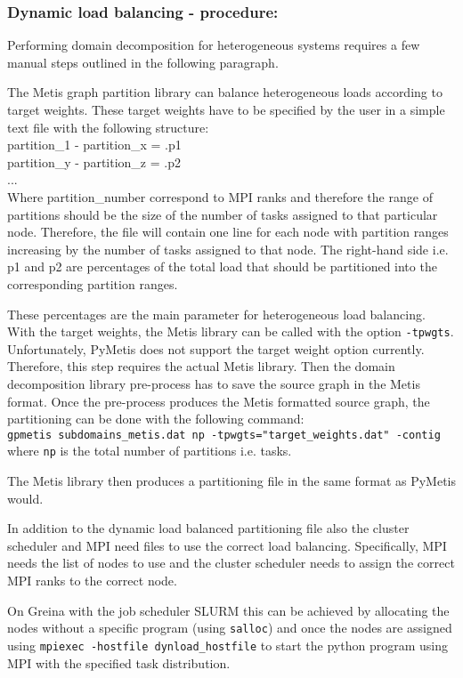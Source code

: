 \subsubsection{Dynamic load balancing - procedure:}
Performing domain decomposition for heterogeneous systems requires a few manual steps outlined in the following paragraph.

The Metis graph partition library can balance heterogeneous loads according to target weights.
These target weights have to be specified by the user in a simple text file with the following structure:
\\
partition\_1 - partition\_x = .p1
\\
partition\_y - partition\_z = .p2
\\
...
\\
Where partition\_number correspond to MPI ranks and therefore the range of partitions should be the size of the number of tasks assigned to that particular node.
Therefore, the file will contain one line for each node with partition ranges increasing by the number of tasks assigned to that node.
The right-hand side i.e. p1 and p2 are percentages of the total load that should be partitioned into the corresponding partition ranges.

These percentages are the main parameter for heterogeneous load balancing.
With the target weights, the Metis library can be called with the option \texttt{-tpwgts}.
Unfortunately, PyMetis does not support the target weight option currently.
Therefore, this step requires the actual Metis library.
Then the domain decomposition library pre-process has to save the source graph in the Metis format.
Once the pre-process produces the Metis formatted source graph, the partitioning can be done with the following command:
\\
\texttt{gpmetis subdomains\_metis.dat np -tpwgts="target\_weights.dat" -contig}
\\
where \texttt{np} is the total number of partitions i.e. tasks.

The Metis library then produces a partitioning file in the same format as PyMetis would.

In addition to the dynamic load balanced partitioning file also the cluster scheduler and MPI need files to use the correct load balancing.
Specifically, MPI needs the list of nodes to use and the cluster scheduler needs to assign the correct MPI ranks to the correct node.

On Greina with the job scheduler SLURM this can be achieved by allocating the nodes without a specific program (using \texttt{salloc}) and once the nodes are assigned using \texttt{mpiexec -hostfile dynload\_hostfile} to start the python program using MPI with the specified task distribution.

